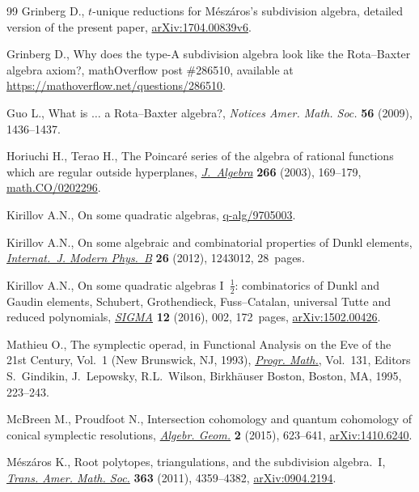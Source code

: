 \documentclass[pdftex]{sigma}
\numberwithin{equation}{section}
\begin{document}
\begin{thebibliography}{99}
Grinberg D., $t$-unique reductions for {M}\'{e}sz\'{a}ros's subdivision
 algebra, {d}etailed version of the present paper, \href{https://arxiv.org/abs/1704.00839v6}{arXiv:1704.00839v6}.

Grinberg D., Why does the type-A subdivision algebra look like the
 {R}ota--{B}axter algebra axiom?, mathOverflow post \#286510, available at
 \url{https://mathoverflow.net/questions/286510}.

Guo L., What is {$\ldots$} a {R}ota--{B}axter algebra?, \textit{Notices Amer.
 Math. Soc.} \textbf{56} (2009), 1436--1437.

Horiuchi H., Terao H., The {P}oincar\'e series of the algebra of rational
 functions which are regular outside hyperplanes, \href{https://doi.org/10.1016/S0021-8693(03)00330-2}{\textit{J.~Algebra}}
 \textbf{266} (2003), 169--179, \href{https://arxiv.org/abs/math.CO/0202296}{math.CO/0202296}.

Kirillov A.N., On some quadratic algebras, \href{https://arxiv.org/abs/q-alg/9705003}{q-alg/9705003}.

Kirillov A.N., On some algebraic and combinatorial properties of {D}unkl
 elements, \href{https://doi.org/10.1142/S0217979212430126}{\textit{Internat.~J. Modern Phys.~B}} \textbf{26} (2012), 1243012,
 28~pages.

Kirillov A.N., On some quadratic algebras {I}~{$\frac{1}{2}$}: combinatorics of
 {D}unkl and {G}audin elements, {S}chubert, {G}rothendieck, {F}uss--{C}atalan,
 universal {T}utte and reduced polynomials, \href{https://doi.org/10.3842/SIGMA.2016.002}{\textit{SIGMA}} \textbf{12} (2016),
 002, 172~pages, \href{https://arxiv.org/abs/1502.00426}{arXiv:1502.00426}.

Mathieu O., The symplectic operad, in Functional Analysis on the Eve of the
 21st Century, {V}ol.~1 ({N}ew {B}runswick, {NJ}, 1993), \href{https://doi.org/10.1007/978-1-4612-4262-8_8}{\textit{Progr.
 Math.}}, Vol.~131, Editors S.~Gindikin, J.~Lepowsky, R.L.~Wilson, Birkh\"auser
 Boston, Boston, MA, 1995, 223--243.

McBreen M., Proudfoot N., Intersection cohomology and quantum cohomology of
 conical symplectic resolutions, \href{https://doi.org/10.14231/AG-2015-026}{\textit{Algebr. Geom.}} \textbf{2} (2015),
 623--641, \href{https://arxiv.org/abs/1410.62402}{arXiv:1410.6240}.

M\'esz\'aros K., Root polytopes, triangulations, and the subdivision
 algebra.~{I}, \href{https://doi.org/10.1090/S0002-9947-2011-05265-7}{\textit{Trans. Amer. Math. Soc.}} \textbf{363} (2011),
 4359--4382, \href{https://arxiv.org/abs/0904.2194}{arXiv:0904.2194}.


\end{thebibliography}
\end{document}
